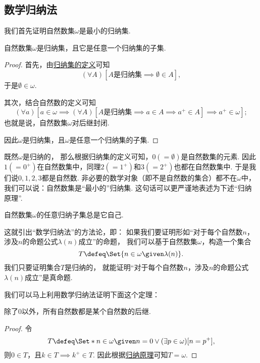 \subsection{数学归纳法}
我们首先证明自然数集\(\omega\)是最小的归纳集.
\begin{theorem}
自然数集\(\omega\)是归纳集，且它是任意一个归纳集的子集.
\begin{proof}
首先，由\hyperref[definition:集合论.归纳集的定义]{归纳集的定义}可知\begin{equation*}
	(\forall A)[\text{\(A\)是归纳集} \implies \emptyset \in A],
\end{equation*}
于是\(\emptyset \in \omega\).

其次，结合自然数的定义可知\begin{equation*}
	(\forall a)[
		a \in \omega
		\implies
		(\forall A)[
			\text{\(A\)是归纳集} \implies a \in A \implies a^+ \in A
		]
		\implies
		a^+ \in \omega
	];
\end{equation*}
也就是说，自然数集\(\omega\)对后继封闭.

因此\(\omega\)是归纳集，且\(\omega\)是任意一个归纳集的子集.
\end{proof}
\end{theorem}

既然\(\omega\)是归纳的，
那么根据归纳集的定义可知，\(0(=\emptyset)\)是自然数集的元素.
因此\(1(=0^+)\)在自然数集中，同理\(2(=1^+)\)和\(3(=2^+)\)也都在自然数集中.
于是我们说\(0,1,2,3\)都是自然数.
非必要的数学对象（即不是自然数的集合）都不在\(\omega\)中，
我们可以说：自然数集是“最小的”归纳集.
这句话可以更严谨地表述为下述“归纳原理”.
\begin{theorem}[归纳原理]\label{theorem:集合论.归纳原理1}
自然数集\(\omega\)的任意归纳子集总是它自己.
\end{theorem}

这就引出“数学归纳法”的方法论，即：
如果我们要证明形如“对于每个自然数\(n\)，涉及\(n\)的命题公式\(\lambda(n)\)成立”的命题，
我们可以基于自然数集\(\omega\)，构造一个集合\begin{equation*}
	T \defeq \Set{ n \in \omega \given \lambda(n) }.
\end{equation*}
我们只要证明集合\(T\)是归纳的，
就能证明“对于每个自然数\(n\)，涉及\(n\)的命题公式\(\lambda(n)\)成立”是真命题.

我们可以马上利用数学归纳法证明下面这个定理：
\begin{theorem}
除了\(0\)以外，所有自然数都是某个自然数的后继.
\begin{proof}
令\begin{equation*}
	T \defeq \Set*{ n \in \omega \given n = 0 \lor (\exists p\in\omega)[n = p^+] },
\end{equation*}
则\(0 \in T\)，且\(k \in T \implies k^+ \in T\).
因此根据\hyperref[theorem:集合论.归纳原理1]{归纳原理}可知\(T = \omega\).
\end{proof}
\end{theorem}

